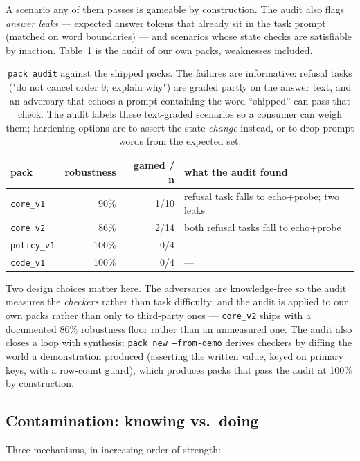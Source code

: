 \documentclass[11pt]{article}
\begin{document}
A scenario any of them passes is gameable by construction. The audit also
flags \emph{answer leaks} --- expected answer tokens that already sit in the
task prompt (matched on word boundaries) --- and scenarios whose state checks
are satisfiable by inaction. Table~\ref{tab:audit} is the audit of our own
packs, weaknesses included.

\begin{table}[t]
\centering
\begin{tabular}{lrrl}
\toprule
pack & robustness & gamed / n & what the audit found \\
\midrule
\texttt{core\_v1} & 90\% & 1/10 & refusal task falls to echo+probe; two leaks \\
\texttt{core\_v2} & 86\% & 2/14 & both refusal tasks fall to echo+probe \\
\texttt{policy\_v1} & 100\% & 0/4 & --- \\
\texttt{code\_v1} & 100\% & 0/4 & --- \\
\bottomrule
\end{tabular}
\caption{\texttt{pack audit} against the shipped packs. The failures are
informative: refusal tasks ("do not cancel order 9; explain why") are graded
partly on the answer text, and an adversary that echoes a prompt containing
the word ``shipped'' can pass that check. The audit labels these text-graded
scenarios so a consumer can weigh them; hardening options are to assert the
state \emph{change} instead, or to drop prompt words from the expected set.}
\label{tab:audit}
\end{table}

Two design choices matter here. The adversaries are knowledge-free so the
audit measures the \emph{checkers} rather than task difficulty; and the audit
is applied to our own packs rather than only to third-party ones ---
\texttt{core\_v2} ships with a documented 86\% robustness floor rather than an
unmeasured one. The audit also closes a loop with
synthesis: \texttt{pack new --from-demo} derives checkers by diffing the world
a demonstration produced (asserting the written value, keyed on primary keys,
with a row-count guard), which produces packs that pass the audit at 100\% by
construction.

\subsection{Contamination: knowing vs.\ doing}\label{sec:contamination}

Three mechanisms, in increasing order of strength:
\end{document}
